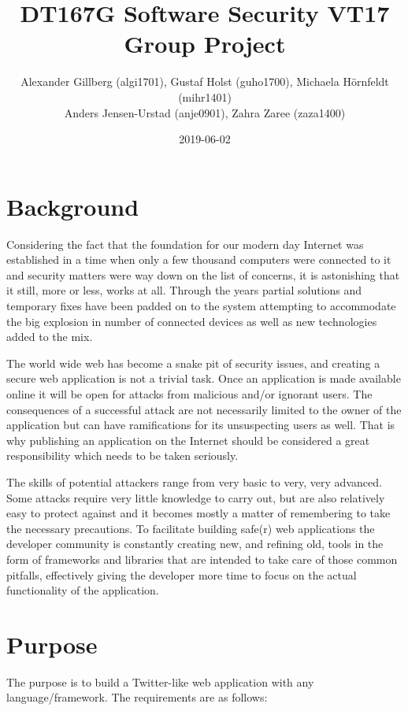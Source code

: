 \documentclass[11pt,english]{article}
\title{DT167G Software Security VT17\\Group Project}
\author{Alexander Gillberg (algi1701), Gustaf Holst (guho1700), Michaela Hörnfeldt (mihr1401)\\Anders Jensen-Urstad (anje0901), Zahra Zaree (zaza1400)}
\date{2019-06-02}
\begin{document}
\begin{titlingpage}
\maketitle
\end{titlingpage}

\section{Background}
Considering the fact that the foundation for our modern day Internet was established in a time when only a few thousand computers were connected to it and security matters were way down on the list of concerns, it is astonishing that it still, more or less, works at all. Through the years partial solutions and temporary fixes have been padded on to the system attempting to accommodate the big explosion in number of connected devices as well as new technologies added to the mix.

The world wide web has become a snake pit of security issues, and creating a secure web application is not a trivial task. Once an application is made available online it will be open for attacks from malicious and/or ignorant users. The consequences of a successful attack are not necessarily limited to the owner of the application but can have ramifications for its unsuspecting users as well. That is why publishing an application on the Internet should be considered a great responsibility which needs to be taken seriously.

The skills of potential attackers range from very basic to very, very advanced. Some attacks require very little knowledge to carry out, but are also relatively easy to protect against and it becomes mostly a matter of remembering to take the necessary precautions. To facilitate building safe(r) web applications the developer community is constantly creating new, and refining old, tools in the form of frameworks and libraries that are intended to take care of those common pitfalls, effectively giving the developer more time to focus on the actual functionality of the application.

\section{Purpose}

The purpose is to build a Twitter-like web application with any language/framework. The requirements are as follows:
\end{document}
